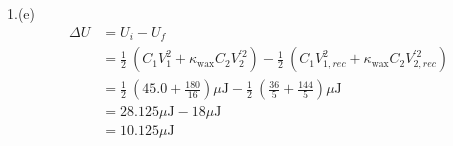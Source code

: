 \documentclass[11pt]{article}
\begin{document}
1.(e)
\begin{align*}
\Delta U &= U_i - U_f \\
         &= \frac{1}{2} \ (C_1 V_1^2 + \kappa_{\mathrm{wax}} C_2 V_2^{'2}) - \frac{1}{2} \ ( C_1 V_{1, rec}^2 + \kappa_{\mathrm{wax}} C_2 V_{2, rec}^{'2}) \\
         &= \frac{1}{2} \ (45.0 + \frac{180}{16}) \mu \mathrm{J} - \frac{1}{2} \ ( \frac{36}{5} + \frac{144}{5} ) \mu \mathrm{J} \\
         &= 28.125 \mu \mathrm{J} - 18 \mu \mathrm{J} \\
         &= 10.125 \mu \mathrm{J}
\end{align*}
\end{document}
